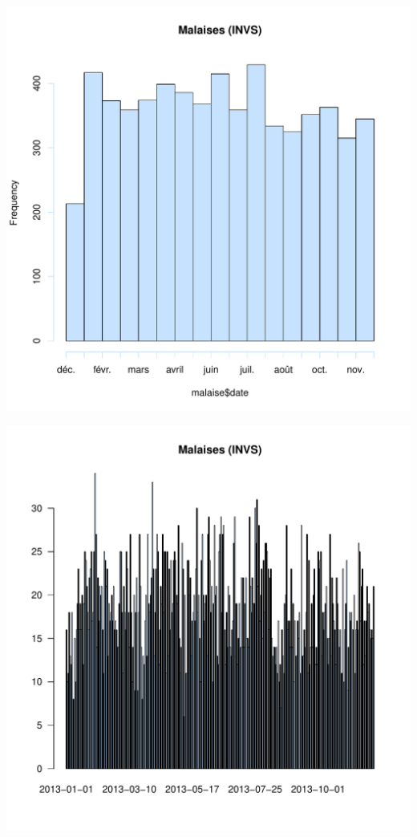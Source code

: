 \documentclass[12pt,english,french,twoside]{report}\usepackage[]{graphicx}\usepackage[]{color}
\makeatletter
\def\maxwidth{ %
  \ifdim\Gin@nat@width>\linewidth
    \linewidth
  \else
    \Gin@nat@width
  \fi
}
\newenvironment{knitrout}{}{} %
\makeatother
\begin{document}
\begin{knitrout}
\color{fgcolor}
\includegraphics[width=\maxwidth]{figure/malaises_invs1} 

\includegraphics[width=\maxwidth]{figure/malaises_invs2} 

\end{knitrout}
\end{document}
